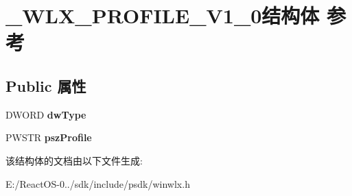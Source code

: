 \hypertarget{struct___w_l_x___p_r_o_f_i_l_e___v1__0}{}\section{\+\_\+\+W\+L\+X\+\_\+\+P\+R\+O\+F\+I\+L\+E\+\_\+\+V1\+\_\+0结构体 参考}
\label{struct___w_l_x___p_r_o_f_i_l_e___v1__0}
\subsection*{Public 属性}
\begin{DoxyCompactItemize}
\item 
\mbox{\label{struct___w_l_x___p_r_o_f_i_l_e___v1__0_a639401d25799f6995c05e3efbb2892ee}} 
D\+W\+O\+RD {\bfseries dw\+Type}
\item 
\mbox{\label{struct___w_l_x___p_r_o_f_i_l_e___v1__0_adf67eaf00c4d0a01b1d24dcd715e3254}} 
P\+W\+S\+TR {\bfseries psz\+Profile}
\end{DoxyCompactItemize}


该结构体的文档由以下文件生成\+:\begin{DoxyCompactItemize}
\item 
E\+:/\+React\+O\+S-\/0../sdk/include/psdk/winwlx.\+h\end{DoxyCompactItemize}
